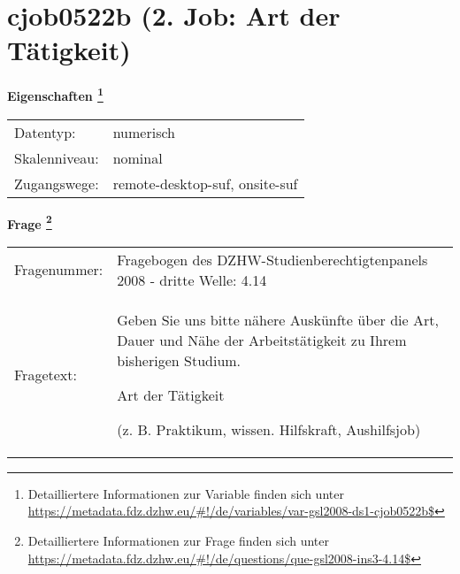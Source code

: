 
    \setcounter{footnote}{0}

    \vspace*{-1.8cm}
	\section{cjob0522b (2. Job: Art der Tätigkeit)}
	\label{section:cjob0522b}



    \vspace*{0.5cm}
    \noindent\textbf{Eigenschaften
	\footnote{Detailliertere Informationen zur Variable finden sich unter
		\url{https://metadata.fdz.dzhw.eu/\#!/de/variables/var-gsl2008-ds1-cjob0522b$}}}\\
	\begin{tabularx}{\hsize}{@{}lX}
	Datentyp: & numerisch \\
	Skalenniveau: & nominal \\
	Zugangswege: &
	  remote-desktop-suf, 
	  onsite-suf
 \\
    \end{tabularx}



				\vspace*{0.5cm}
                \noindent\textbf{Frage
	                \footnote{Detailliertere Informationen zur Frage finden sich unter
		              \url{https://metadata.fdz.dzhw.eu/\#!/de/questions/que-gsl2008-ins3-4.14$}}}\\
				\begin{tabularx}{\hsize}{@{}lX}
					Fragenummer: &
					  Fragebogen des DZHW-Studienberechtigtenpanels 2008 - dritte Welle:
					  4.14
 \\
					Fragetext: & Geben Sie uns bitte nähere Auskünfte über die Art, Dauer und Nähe der Arbeitstätigkeit zu Ihrem bisherigen Studium.\par  Art der Tätigkeit\par  (z. B. Praktikum, wissen. Hilfskraft, Aushilfsjob) \\
				\end{tabularx}





